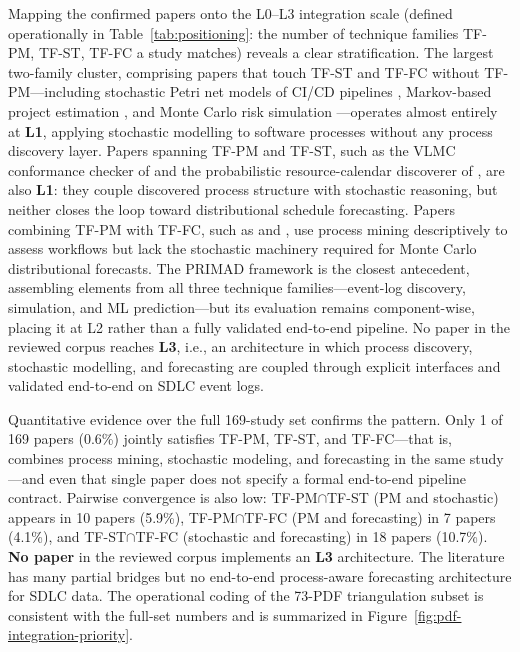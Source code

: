 Mapping the confirmed papers onto the L0--L3 integration scale (defined
operationally in Table~\ref{tab:positioning}: the number of technique families
TF-PM, TF-ST, TF-FC a study matches) reveals a clear stratification. The
largest two-family cluster, comprising papers that touch TF-ST and TF-FC
without TF-PM---including stochastic Petri net models of CI/CD pipelines
\cite{bhadra2022,bhadra2023}, Markov-based project estimation
\cite{massitela2018,tyagi2021}, and Monte Carlo risk simulation
\cite{lunesu2021,magennis2015}---operates almost entirely at \textbf{L1},
applying stochastic modelling to software processes without any process
discovery layer. Papers spanning TF-PM and TF-ST, such as the VLMC conformance
checker of \cite{incerto2025} and the probabilistic resource-calendar discoverer
of \cite{lopezpintado2023}, are also \textbf{L1}: they couple discovered
process structure with stochastic reasoning, but neither closes the loop
toward distributional schedule forecasting. Papers combining TF-PM with TF-FC, such as
\cite{gupta2017} and \cite{caldeira2022}, use process mining descriptively to
assess workflows but lack the stochastic machinery required for Monte Carlo
distributional forecasts. The PRIMAD framework \cite{guinea2025} is the closest
antecedent, assembling elements from all three technique families---event-log discovery,
simulation, and ML prediction---but its evaluation remains component-wise,
placing it at L2 rather than a fully validated end-to-end pipeline. No paper
in the reviewed corpus reaches \textbf{L3}, i.e., an architecture in which
process discovery, stochastic modelling, and forecasting are coupled through
explicit interfaces and validated end-to-end on SDLC event logs.

Quantitative evidence over the full 169-study set confirms the pattern. Only
1 of 169 papers (0.6\%) jointly satisfies TF-PM, TF-ST, and TF-FC---that is,
combines process mining, stochastic modeling, and forecasting in the same
study---and even that single paper does not specify a formal end-to-end
pipeline contract. Pairwise convergence is also low: TF-PM$\cap$TF-ST (PM and
stochastic) appears in 10 papers (5.9\%), TF-PM$\cap$TF-FC (PM and forecasting)
in 7 papers (4.1\%), and TF-ST$\cap$TF-FC (stochastic and forecasting) in 18
papers (10.7\%). \textbf{No paper} in the reviewed corpus implements an
\textbf{L3} architecture. The literature has many partial bridges but no
end-to-end process-aware forecasting architecture for SDLC data. The
operational coding of the 73-PDF triangulation subset is consistent with the
full-set numbers and is summarized in
Figure~\ref{fig:pdf-integration-priority}.

